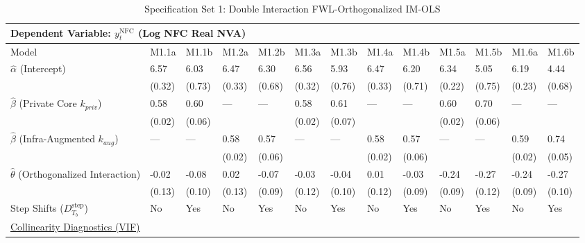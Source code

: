 \begin{table}[H]
\centering
\caption{Specification Set 1: Double Interaction FWL-Orthogonalized IM-OLS}
\label{tab:spec_set_1}
\scriptsize
\begin{tabular}{p{3.8cm}p{1.5cm}p{1.5cm}p{1.5cm}p{1.5cm}p{1.5cm}p{1.5cm}p{1.5cm}p{1.5cm}p{1.5cm}p{1.5cm}p{1.5cm}p{1.5cm}}
\toprule
\multicolumn{13}{l}{\textbf{Dependent Variable: $y_t^{\text{NFC}}$ (Log NFC Real NVA)}} \\
\midrule
Model & M1.1a & M1.1b & M1.2a & M1.2b & M1.3a & M1.3b & M1.4a & M1.4b & M1.5a & M1.5b & M1.6a & M1.6b  \\
\midrule
$\hat{\alpha}$ (Intercept)  & 6.57 & 6.03 & 6.47 & 6.30 & 6.56 & 5.93 & 6.47 & 6.20 & 6.34 & 5.05 & 6.19 & 4.44  \\
 & {\scriptsize (0.32)} & {\scriptsize (0.73)} & {\scriptsize (0.33)} & {\scriptsize (0.68)} & {\scriptsize (0.32)} & {\scriptsize (0.76)} & {\scriptsize (0.33)} & {\scriptsize (0.71)} & {\scriptsize (0.22)} & {\scriptsize (0.75)} & {\scriptsize (0.23)} & {\scriptsize (0.68)}  \\
$\hat{\beta}$ (Private Core $k_{priv}$)  & 0.58 & 0.60 & --- & --- & 0.58 & 0.61 & --- & --- & 0.60 & 0.70 & --- & ---  \\
 & {\scriptsize (0.02)} & {\scriptsize (0.06)} &  &  & {\scriptsize (0.02)} & {\scriptsize (0.07)} &  &  & {\scriptsize (0.02)} & {\scriptsize (0.06)} &  &   \\
$\hat{\beta}$ (Infra-Augmented $k_{aug}$)  & --- & --- & 0.58 & 0.57 & --- & --- & 0.58 & 0.57 & --- & --- & 0.59 & 0.74  \\
 &  &  & {\scriptsize (0.02)} & {\scriptsize (0.06)} &  &  & {\scriptsize (0.02)} & {\scriptsize (0.06)} &  &  & {\scriptsize (0.02)} & {\scriptsize (0.05)}  \\
$\hat{\theta}$ (Orthogonalized Interaction)  & -0.02 & -0.08 & 0.02 & -0.07 & -0.03 & -0.04 & 0.01 & -0.03 & -0.24 & -0.27 & -0.24 & -0.27  \\
 & {\scriptsize (0.13)} & {\scriptsize (0.10)} & {\scriptsize (0.13)} & {\scriptsize (0.09)} & {\scriptsize (0.12)} & {\scriptsize (0.10)} & {\scriptsize (0.12)} & {\scriptsize (0.09)} & {\scriptsize (0.09)} & {\scriptsize (0.12)} & {\scriptsize (0.09)} & {\scriptsize (0.10)}  \\
Step Shifts ($D^{\text{step}}_{T_b}$)  & No & Yes & No & Yes & No & Yes & No & Yes & No & Yes & No & Yes  \\
\midrule
\multicolumn{13}{l}{\underline{Collinearity Diagnostics (VIF)}} \\

\end{tabular}
\end{table}
